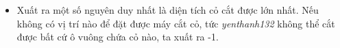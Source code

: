 \begin{itemize}
	\item     Xuất ra một số nguyên duy nhất là diện tích cỏ cắt được lớn nhất. Nếu không có vị trí nào để đặt được máy cắt cỏ, tức    \emph{     yenthanh132    }    không thể cắt được bất cứ ô vuông chứa cỏ nào, ta xuất ra -1.   
\end{itemize}